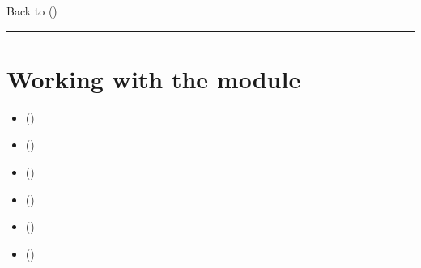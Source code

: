 \documentclass[a4paper,12pt,english]{sphinxhowto}
\begin{document}
Back to {\hyperref[\detokenize{tutorial:tutorial-label}]{}} ()


\bigskip\hrule\bigskip



\section{Working with the  module}
\label{\detokenize{tutorial:working-with-the-graphs-module}}\label{\detokenize{tutorial:graphs-tutorial-label}}
\begin{sphinxShadowBox}
\begin{itemize}
\item {} 
\label{\detokenize{tutorial:id300}}{\hyperref[\detokenize{tutorial:structure-of-a-graph-object}]{}} ()

\item {} 
\label{\detokenize{tutorial:id301}}{\hyperref[\detokenize{tutorial:q-coloring-of-a-graph}]{}} ()

\item {} 
\label{\detokenize{tutorial:id302}}{\hyperref[\detokenize{tutorial:mis-and-clique-enumeration}]{}} ()

\item {} 
\label{\detokenize{tutorial:id303}}{\hyperref[\detokenize{tutorial:line-graphs-and-maximal-matchings}]{}} ()

\item {} 
\label{\detokenize{tutorial:id304}}{\hyperref[\detokenize{tutorial:grids-and-the-ising-model}]{}} ()

\item {} 
\label{\detokenize{tutorial:id305}}{\hyperref[\detokenize{tutorial:simulating-metropolis-random-walks}]{}} ()

\end{itemize}
\end{sphinxShadowBox}
\end{document}
